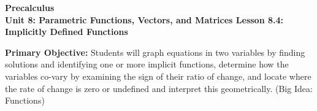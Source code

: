 \documentclass[10pt]{article}
\newcommand{\CourseName}{Precalculus}
\newcommand{\UnitNumberName}{Unit 8: Parametric Functions, Vectors, and Matrices \quad}
\newcommand{\LessonNumberName}{Lesson 8.4: Implicitly Defined Functions}
\begin{document}
\begin{center}
    {\Large\bfseries \CourseName \\
    {\small\bfseries \UnitNumberName \LessonNumberName}}
\end{center}

\begin{tcolorbox}[colback=sky, colframe=navy, boxrule=0.9pt, arc=2mm,
    left=2mm, right=2mm, top=1.5mm, bottom=1.5mm]
    \textbf{Primary Objective:} Students will graph equations in two variables by finding
    solutions and identifying one or more implicit functions, determine how the variables
    co-vary by examining the sign of their ratio of change, and locate where the rate of
    change is zero or undefined and interpret this geometrically. (Big Idea: Functions)
\end{tcolorbox}
\end{document}
